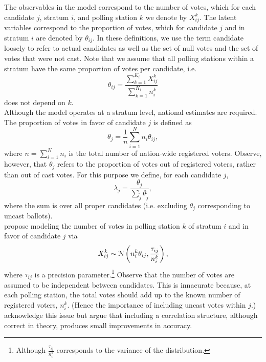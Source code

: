 \documentclass{article}
\begin{document}
The observables in the model correspond to the number of votes, which for each candidate $j$, stratum $i$, and polling station $k$ we denote by $X_{ij}^k$. The latent variables correspond to the proportion of votes, which for candidate $j$ and in stratum $i$ are denoted by $\theta_{ij}$. In these definitions, we use the term candidate loosely to refer to actual candidates as well as the set of null votes and the set of votes that were not cast. Note that we assume that all polling stations within a stratum have the same proportion of votes per candidate, i.e.
\[
\theta_{ij} = \frac{\sum_{k=1}^{K_i} X_{ij}^k}{\sum_{k=1}^{K_i} n_{i}^k}
\]
does not depend on $k$.
\\

Although the model operates at a stratum level, national estimates are required. The proportion of votes in favor of candidate $j$ is defined as
\[
  \theta_j = \frac{1}{n} \sum_{i=1}^N n_i \theta_{ij}, \label{eq:thetaj}
\]
where $n = \sum_{i=1}^N n_i$ is the total number of nation-wide registered voters. Observe, however, that $\theta_j$ refers to the proportion of votes out of registered voters, rather than out of cast votes. For this purpose we define, for each candidate $j$,
\[
  \lambda_j = \frac{\theta_j}{\sum_{\tilde{j}} \theta_{\tilde{j}}},  \label{eq:lambdaj}
\]
where the sum is over all proper candidates (i.e. excluding $\theta_j$ corresponding to uncast ballots). \\



\citet{mendoza-nieto2016} propose modeling the number of votes in polling station $k$ of stratum $i$ and in favor of candidate $j$ via
\[
  X_{ij}^k \sim \mathcal{N} \left( n_i^k \theta_{ij}, \frac{\tau_{ij}}{n_i^k} \right), \label{eq:original_likelihood}
\]
where $\tau_{ij}$ is a precision parameter.\footnote{Although $\frac{\tau_{ij}}{n_i^k}$ corresponds to the variance of the distribution.} Observe that the number of votes are assumed to be independent between candidates. This is innacurate because, at each polling station, the total votes should add up to the known number of registered voters, $n_i^k$. (Hence the importance of including uncast votes within $j$.) \citet{mendoza-nieto2016} acknowledge this issue but argue that including a correlation structure, although correct in theory, produces small improvements in accuracy. \\
\end{document}

